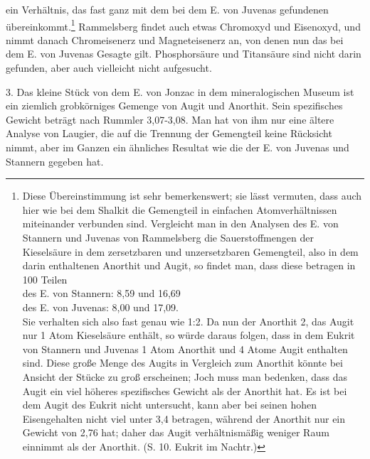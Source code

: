 \documentclass[a4paper, 11pt, oneside]{article}
\begin{document}
ein Verhältnis, das fast ganz mit dem bei dem E. von Juvenas gefundenen übereinkommt.\footnote{Diese Übereinstimmung ist sehr bemerkenswert; sie lässt vermuten, dass auch hier wie bei dem Shalkit die Gemengteil in einfachen Atomverhältnissen miteinander verbunden sind. Vergleicht man in den Analysen des E. von Stannern und Juvenas von Rammelsberg die Sauerstoffmengen der Kieselsäure in dem zersetzbaren und unzersetzbaren Gemengteil, also in dem darin enthaltenen Anorthit und Augit, so findet man, dass diese betragen in 100 Teilen\\
des E. von Stannern: 8,59 und 16,69\\
des E. von Juvenas: 8,00 und 17,09.\\
Sie verhalten sich also fast genau wie 1:2. Da nun der Anorthit 2, das Augit nur 1 Atom Kieselsäure enthält, so würde daraus folgen, dass in dem Eukrit von Stannern und Juvenas 1 Atom Anorthit und 4 Atome Augit enthalten sind. Diese große Menge des Augits in Vergleich zum Anorthit könnte bei Ansicht der Stücke zu groß erscheinen; Joch muss man bedenken, dass das Augit ein viel höheres spezifisches Gewicht als der Anorthit hat. Es ist bei dem Augit des Eukrit nicht untersucht, kann aber bei seinen hohen Eisengehalten nicht viel unter 3,4 betragen, während der Anorthit nur ein Gewicht von 2,76 hat; daher das Augit verhältnismäßig weniger Raum einnimmt als der Anorthit. (S. 10. Eukrit im Nachtr.)} Rammelsberg findet auch etwas Chromoxyd und Eisenoxyd, und nimmt danach Chromeisenerz und Magneteisenerz an, von denen nun das bei dem E. von Juvenas Gesagte gilt. Phosphorsäure und Titansäure sind nicht darin gefunden, aber auch vielleicht nicht aufgesucht.

3. Das kleine Stück von dem E. von Jonzac in dem mineralogischen Museum ist ein ziemlich grobkörniges Gemenge von Augit und Anorthit. Sein spezifisches Gewicht beträgt nach Rummler 3,07-3,08. Man hat von ihm nur eine ältere Analyse von Laugier, die auf die Trennung der Gemengteil keine Rücksicht nimmt, aber im Ganzen ein ähnliches Resultat wie die der E. von Juvenas und Stannern gegeben hat.
\end{document}
